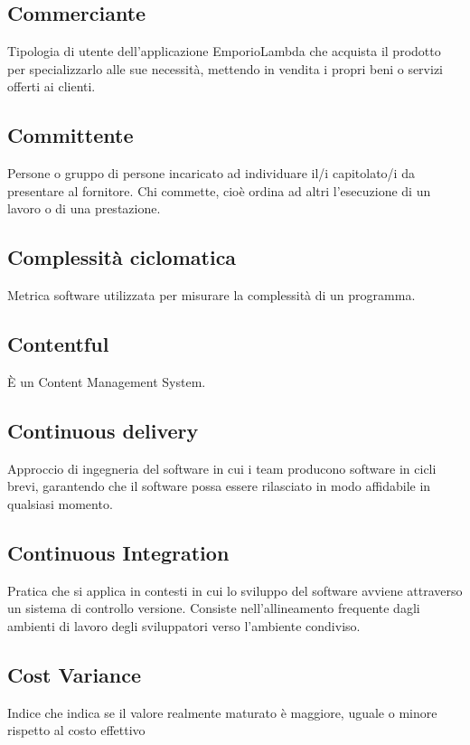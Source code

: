 \subsection*{Commerciante}
Tipologia di utente dell'applicazione EmporioLambda che acquista il prodotto per specializzarlo alle sue necessità, mettendo in vendita i propri beni o servizi offerti ai clienti.

\subsection*{Committente}
Persone o gruppo di persone incaricato ad individuare il/i capitolato/i da presentare al fornitore. Chi commette, cioè ordina ad altri l'esecuzione di un lavoro o di una prestazione.

\subsection*{Complessità ciclomatica}
Metrica software utilizzata per misurare la complessità di un programma.

\subsection*{Contentful}
È un Content Management System.

\subsection*{Continuous delivery}
Approccio di ingegneria del software in cui i team producono software in cicli brevi, garantendo che il software possa essere rilasciato in modo affidabile in qualsiasi momento.

\subsection*{Continuous Integration}
Pratica che si applica in contesti in cui lo sviluppo del software avviene attraverso un sistema di controllo versione. Consiste nell'allineamento frequente dagli ambienti di lavoro degli sviluppatori verso l'ambiente condiviso.

\subsection*{Cost Variance}
Indice che indica se il valore realmente maturato è maggiore, uguale o minore rispetto al costo effettivo

